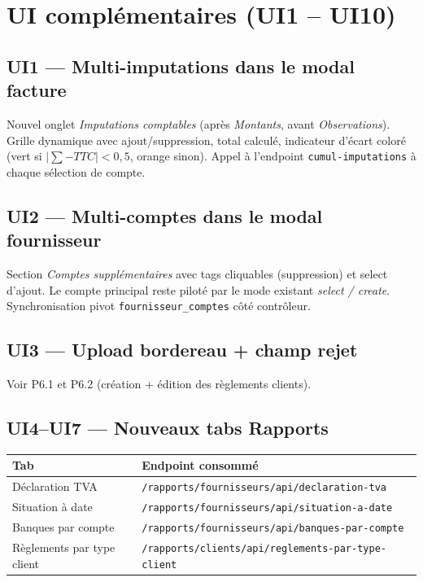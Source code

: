 \documentclass[11pt,a4paper]{article}
\begin{document}
\newpage

\section{UI complémentaires (UI1 -- UI10)}

\subsection{UI1 --- Multi-imputations dans le modal facture}

Nouvel onglet \emph{Imputations comptables} (après \emph{Montants}, avant
\emph{Observations}). Grille dynamique avec ajout/suppression, total calculé,
indicateur d'écart coloré (vert si \(|\sum - TTC| < 0{,}5\), orange sinon).
Appel à l'endpoint \texttt{cumul-imputations} à chaque sélection de compte.

\subsection{UI2 --- Multi-comptes dans le modal fournisseur}

Section \emph{Comptes supplémentaires} avec tags cliquables (suppression) et
select d'ajout. Le compte principal reste piloté par le mode existant
\emph{select / create}. Synchronisation pivot \texttt{fournisseur\_comptes}
côté contrôleur.

\subsection{UI3 --- Upload bordereau + champ rejet}

Voir P6.1 et P6.2 (création + édition des règlements clients).

\subsection{UI4--UI7 --- Nouveaux tabs Rapports}

\begin{tabularx}{\linewidth}{@{}l X@{}}
  \toprule
  \textbf{Tab} & \textbf{Endpoint consommé} \\
  \midrule
  Déclaration TVA & \texttt{/rapports/fournisseurs/api/declaration-tva} \\
  Situation à date & \texttt{/rapports/fournisseurs/api/situation-a-date} \\
  Banques par compte & \texttt{/rapports/fournisseurs/api/banques-par-compte} \\
  Règlements par type client & \texttt{/rapports/clients/api/reglements-par-type-client} \\
  \bottomrule
\end{tabularx}
\end{document}
